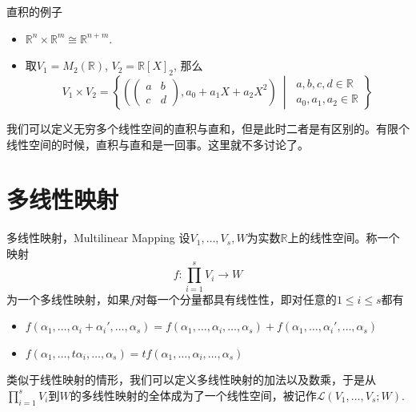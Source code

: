 \begin{frame}

\begin{block}{直积的例子}
\begin{itemize}
\item $\mathbb{R}^n \times \mathbb{R}^m \cong \mathbb{R}^{n+m}$.
\vspace{1em}
\item 取$V_1 = M_2(\mathbb{R})$, $V_2 = \mathbb{R}[X]_2$, 那么
$$V_1\times V_2 = \left\{ \left( \begin{pmatrix} a & b \\ c & d \end{pmatrix}, a_0 + a_1X + a_2X^2 \right) \ \middle|\ \substack{a,b,c,d\in\mathbb{R} \\ a_0,a_1,a_2\in\mathbb{R}} \right\}$$
\end{itemize}
\end{block}

\pause
\vspace{2em}

\begin{remark}
我们可以定义无穷多个线性空间的直积与直和，但是此时二者是有区别的。有限个线性空间的时候，直积与直和是一回事。这里就不多讨论了。
\end{remark}

\end{frame}


\section{多线性映射}


\begin{frame}

\begin{block}{多线性映射，Multilinear Mapping}
设$V_1,\ldots,V_s,W$为实数$\mathbb{R}$上的线性空间。称一个映射
$$f: \prod_{i=1}^s V_i \rightarrow W$$
为一个多线性映射，如果$f$对每一个分量都具有线性性，即对任意的$1\leqslant i \leqslant s$都有
\begin{itemize}
\item $f(\alpha_1,\ldots,\alpha_i+\alpha_i',\ldots,\alpha_s) = f(\alpha_1,\ldots,\alpha_i,\ldots,\alpha_s) + f(\alpha_1,\ldots,\alpha_i',\ldots,\alpha_s)$
\item $f(\alpha_1,\ldots,t\alpha_i,\ldots,\alpha_s) = tf(\alpha_1,\ldots,\alpha_i,\ldots,\alpha_s)$
\end{itemize}

\pause

类似于线性映射的情形，我们可以定义多线性映射的加法以及数乘，于是从$\prod\limits_{i=1}^s V_i$到$W$的多线性映射的全体成为了一个线性空间，被记作$\mathcal{L}(V_1,\ldots,V_s;W)$.
\end{block}

\end{frame}

